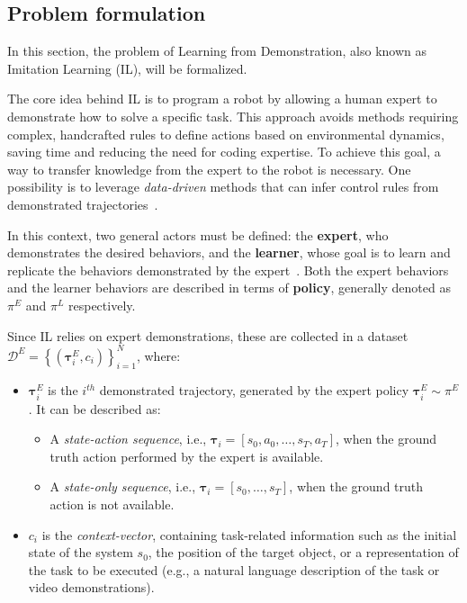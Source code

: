 \subsection{Problem formulation}
\label{sec:problem_formulation}
In this section, the problem of Learning from Demonstration, also known as Imitation Learning (IL), will be formalized.

The core idea behind IL is to program a robot by allowing a human expert to demonstrate how to solve a specific task. This approach avoids methods requiring complex, handcrafted rules to define actions based on environmental dynamics, saving time and reducing the need for coding expertise. To achieve this goal, a way to transfer knowledge from the expert to the robot is necessary. One possibility is to leverage \textit{data-driven} methods that can infer control rules from demonstrated trajectories~\cite{osa2018algorithmic}.

In this context, two general actors must be defined: the \textbf{expert}, who demonstrates the desired behaviors, and the \textbf{learner}, whose goal is to learn and replicate the behaviors demonstrated by the expert~\cite{osa2018algorithmic,zare2024survey}. Both the expert behaviors and the learner behaviors are described in terms of \textbf{policy}, generally denoted as $\pi^{E}$ and $\pi^{L}$ respectively.

Since IL relies on expert demonstrations, these are collected in a dataset $\mathcal{D}^{E}=\left\{\left(\boldsymbol{\tau}^{E}_{i}, c_{i}\right)\right\}_{i=1}^{N}$, where:
\begin{itemize}
    \item $\boldsymbol{\tau}^{E}_{i}$ is the $i^{th}$ demonstrated trajectory, generated by the expert policy $\boldsymbol{\tau}^{E}_{i}\sim\pi^{E}$. It can be described as:
        \begin{itemize}
            \item A \textit{state-action sequence}, i.e., $\boldsymbol{\tau}_{i} = [s_{0}, a_{0}, \dots, s_{T}, a_{T}]$, when the ground truth action performed by the expert is available.
            \item A \textit{state-only sequence}, i.e., $\boldsymbol{\tau}_{i} = [s_{0}, \dots, s_{T}]$, when the ground truth action is not available.
        \end{itemize}
    \item $c_{i}$ is the \textit{context-vector}, containing task-related information such as the initial state of the system $s_{0}$, the position of the target object, or a representation of the task to be executed (e.g., a natural language description of the task or video demonstrations).
\end{itemize}

